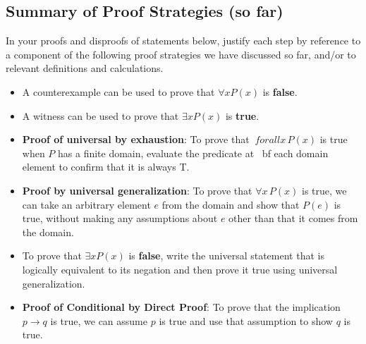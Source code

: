\documentclass[12pt, oneside]{article}
\begin{document}
\subsection*{Summary of Proof Strategies (so far)}
In your proofs and disproofs of statements below, justify each
step
by reference to a component of the following proof strategies
we have discussed so far, and/or to relevant definitions and
calculations.
\begin{itemize}
\item A counterexample can be used to prove that $\forall x
P(x)$ is {\bf false}.
\item A witness can be used to prove that $\exists x P(x)$
is {\bf true}.
\item {\bf Proof of universal by exhaustion}: To prove that $\
forall x \, P(x)$
is true when $P$ has a finite domain, evaluate the predicate at {\
bf each} domain element to confirm that it is always T.
\item {\bf Proof by universal generalization}: To prove that
$\forall x \, P(x)$
is true, we can take an arbitrary element $e$ from the domain and
show that $P(e)$ is true, without making any assumptions about
$e$ other than that it comes from the domain.
\item To prove that $\exists x P(x)$ is {\bf false}, write
the universal statement that is logically equivalent to its
negation and then prove it true using universal generalization.
\item {\bf Proof of Conditional by Direct Proof}: To prove
that the implication $p \to q$ is true, we can assume $p$ is true
and use that assumption to show $q$ is true.
\end{itemize}
\newpage
\end{document}

